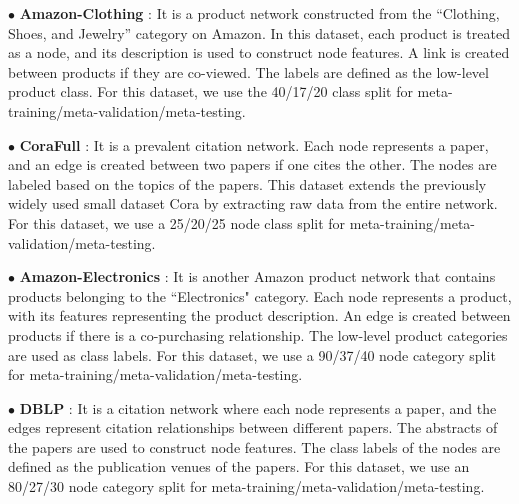 \noindent $\bullet$ \textbf{Amazon-Clothing} \cite{mcauley2015inferring}: It is a product network constructed from the ``Clothing, Shoes, and Jewelry'' category on Amazon. In this dataset, each product is treated as a node, and its description is used to construct node features. A link is created between products if they are co-viewed. The labels are defined as the low-level product class. For this dataset, we use the 40/17/20 class split for meta-training/meta-validation/meta-testing.

\noindent $\bullet$ \textbf{CoraFull} \cite{bojchevski2017deep}: It is a prevalent citation network. Each node represents a paper, and an edge is created between two papers if one cites the other. The nodes are labeled based on the topics of the papers. This dataset extends the previously widely used small dataset Cora by extracting raw data from the entire network. For this dataset, we use a 25/20/25 node class split for meta-training/meta-validation/meta-testing.

\noindent $\bullet$ \textbf{Amazon-Electronics} \cite{mcauley2015inferring}: It is another Amazon product network that contains products belonging to the ``Electronics" category. Each node represents a product, with its features representing the product description. An edge is created between products if there is a co-purchasing relationship. The low-level product categories are used as class labels. For this dataset, we use a 90/37/40 node category split for meta-training/meta-validation/meta-testing.

\noindent $\bullet$ \textbf{DBLP} \cite{tang2008arnetminer}: It is a citation network where each node represents a paper, and the edges represent citation relationships between different papers. The abstracts of the papers are used to construct node features. The class labels of the nodes are defined as the publication venues of the papers. For this dataset, we use an 80/27/30 node category split for meta-training/meta-validation/meta-testing.


